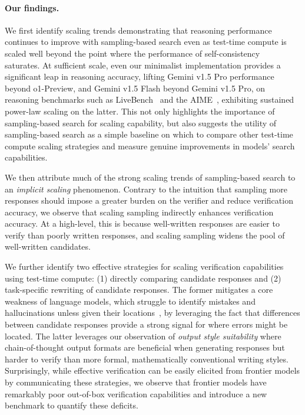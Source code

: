 \paragraph{Our findings.}
We first identify scaling trends demonstrating that reasoning performance continues to improve with sampling-based search even as test-time compute is scaled well beyond the point where the performance of self-consistency~\citep{DBLP:conf/iclr/0002WSLCNCZ23} saturates.
At sufficient scale, even our minimalist implementation provides a significant leap in reasoning accuracy, lifting Gemini v1.5 Pro performance beyond o1-Preview, and Gemini v1.5 Flash beyond Gemini v1.5 Pro, on reasoning benchmarks such as LiveBench~\citep{white2024livebenchchallengingcontaminationfreellm} and the AIME~\citep{aime2024}, exhibiting sustained power-law scaling on the latter.
This not only highlights the importance of sampling-based search for scaling capability, but also suggests the utility of sampling-based search as a simple baseline on which to compare other test-time compute scaling strategies and measure genuine improvements in models' search capabilities.

We then attribute much of the strong scaling trends of sampling-based search to an \emph{implicit scaling} phenomenon.
Contrary to the intuition that sampling more responses should impose a greater burden on the verifier and reduce verification accuracy, we observe that scaling sampling indirectly enhances verification accuracy.
At a high-level, this is because well-written responses are easier to verify than poorly written responses, and scaling sampling widens the pool of well-written candidates.

We further identify two effective strategies for scaling verification capabilities using test-time compute: (1) directly comparing candidate responses and (2) task-specific rewriting of candidate responses.
The former mitigates a core weakness of language models, which struggle to identify mistakes and hallucinations unless given their locations~\citep{tyen_llms_2024}, by leveraging the fact that differences between candidate responses provide a strong signal for where errors might be located.
The latter leverages our observation of \emph{output style suitability} where chain-of-thought output formats are beneficial when generating responses but harder to verify than more formal, mathematically conventional writing styles.
Surprisingly, while effective verification can be easily elicited from frontier models by communicating these strategies, we observe that frontier models have remarkably poor out-of-box verification capabilities and introduce a new benchmark to quantify these deficits.
